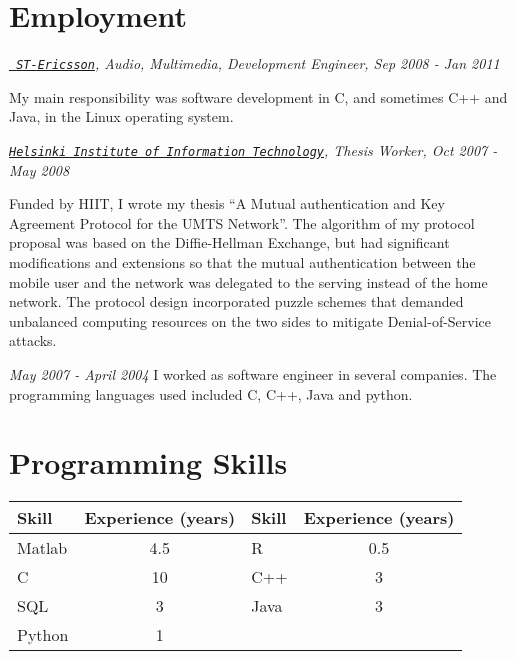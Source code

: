 \documentclass[10pt,letterpaper]{article}
\newenvironment{aperiod}{
  \begin{list}{}{
    \setlength{\leftmargin}{1.5em}
    \setlength{\itemsep}{1em}
    \setlength{\parskip}{0pt}
    \setlength{\parsep}{0.25em}
  }
}{
  \end{list}
}
\begin{document}
\section*{Employment}
\begin{aperiod}
\item {\it \href{http://www.stericsson.com}{\tt
      ST-Ericsson}, Audio, Multimedia, Development Engineer, Sep 2008
    - Jan 2011}

  My main responsibility was software development in C, and sometimes
  C++ and Java, in the Linux operating system.

\item {\it \href{http://www.hiit.fi}{\tt Helsinki
      Institute of Information Technology}, Thesis Worker, Oct 2007 -
    May 2008}

  Funded by HIIT, I wrote my thesis ``A Mutual authentication and Key
  Agreement Protocol for the UMTS Network''. The algorithm of my
  protocol proposal was based on the Diffie-Hellman Exchange, but had
  significant modifications and extensions so that the mutual
  authentication between the mobile user and the network was delegated
  to the serving instead of the home network. The protocol design
  incorporated puzzle schemes that demanded unbalanced computing
  resources on the two sides to mitigate Denial-of-Service attacks.

\item {\it May 2007 - April 2004}
  I worked as software engineer in several companies. The programming
  languages used included C, C++, Java and python.
\end{aperiod}

\section*{Programming Skills}
\begin{table}[htb!]
  \centering
  \begin{tabular}{|l|c|| l |c|}
    \hline
    Skill & Experience (years) & Skill & Experience (years) \\
    \hline
    Matlab & 4.5 & R & 0.5 \\
    C & 10 & C++ & 3 \\
    SQL & 3 & Java & 3 \\
    Python & 1 &&\\
    \hline
  \end{tabular}
\end{table}

\end{document}
